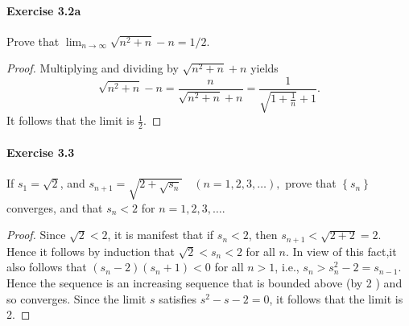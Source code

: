 \documentclass{article}
\theoremstyle{definition}
\begin{document}
\paragraph{Exercise 3.2a} Prove that $\lim_{n \rightarrow \infty}\sqrt{n^2 + n} -n = 1/2$.
\begin{proof}
    Multiplying and dividing by $\sqrt{n^2+n}+n$ yields
$$
\sqrt{n^2+n}-n=\frac{n}{\sqrt{n^2+n}+n}=\frac{1}{\sqrt{1+\frac{1}{n}}+1} .
$$
It follows that the limit is $\frac{1}{2}$.
\end{proof}


\paragraph{Exercise 3.3} If $s_{1}=\sqrt{2}$, and $s_{n+1}=\sqrt{2+\sqrt{s_{n}}} \quad(n=1,2,3, \ldots),$ prove that $\left\{s_{n}\right\}$ converges, and that $s_{n}<2$ for $n=1,2,3, \ldots$.
\begin{proof}
    Since $\sqrt{2}<2$, it is manifest that if $s_n<2$, then $s_{n+1}<\sqrt{2+2}=2$. Hence it follows by induction that $\sqrt{2}<s_n<2$ for all $n$. In view of this fact,it also follows that $\left(s_n-2\right)\left(s_n+1\right)<0$ for all $n>1$, i.e., $s_n>s_n^2-2=s_{n-1}$. Hence the sequence is an increasing sequence that is bounded above (by 2 ) and so converges. Since the limit $s$ satisfies $s^2-s-2=0$, it follows that the limit is 2.
\end{proof}
\end{document}
